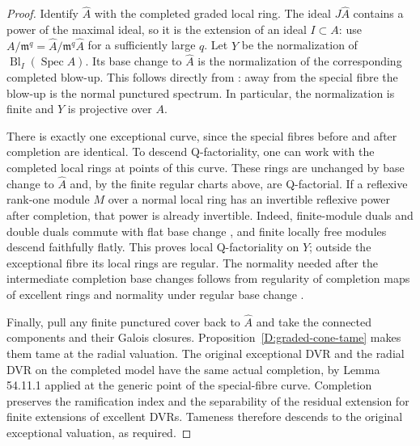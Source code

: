 \begin{proof}
Identify $\widehat A$ with the completed graded local ring.
The ideal $J\widehat A$ contains a power of the maximal ideal,
so it is the extension of an ideal $I\subset A$: use
$A/\mathfrak m^q=\widehat A/\mathfrak m^q\widehat A$ for a
sufficiently large $q$.  Let $Y$ be the normalization of
$\operatorname{Bl}_I(\operatorname{Spec}A)$.  Its base change to
$\widehat A$ is the normalization of the corresponding completed
blow-up.  This follows directly from
\cite[Lemmas 54.11.3 and 54.11.6, tag 0BG4]{C_StacksWeightedCone}:
away from the special fibre the blow-up is the normal punctured
spectrum.  In particular, the normalization is finite and $Y$
is projective over $A$.

There is exactly one exceptional curve, since the special fibres
before and after completion are identical.  To descend
Q-factoriality, one can work with the completed local rings at
points of this curve.  These rings are unchanged by base change
to $\widehat A$
\cite[Lemma 54.11.1, tag 0BG4]{C_StacksWeightedCone} and, by the
finite regular charts above, are Q-factorial.  If a reflexive
rank-one module $M$ over a normal local ring has an invertible
reflexive power after completion, that power is already
invertible.  Indeed, finite-module duals and double duals commute
with flat base change
\cite[Lemma 17.22.5, tag 01CM]{C_StacksWeightedCone},
and finite locally free modules descend
faithfully flatly.  This proves local Q-factoriality on $Y$;
outside the exceptional fibre its local rings are regular.
The normality needed after the intermediate completion base
changes follows from regularity of completion maps of excellent
rings and normality under regular base change
\cite[tags 0BFK and 0H7S]{C_StacksWeightedCone}.

Finally, pull any finite punctured cover back to $\widehat A$ and
take the connected components and their Galois closures.
Proposition~\ref{D:graded-cone-tame} makes them tame at the
radial valuation.  The original exceptional DVR and the radial
DVR on the completed model have the same actual completion, by
Lemma 54.11.1 applied at the generic point of the special-fibre
curve.  Completion preserves the ramification index and the
separability of the residual extension for finite extensions of
excellent DVRs.  Tameness therefore descends to the original
exceptional valuation, as required.
\end{proof}

